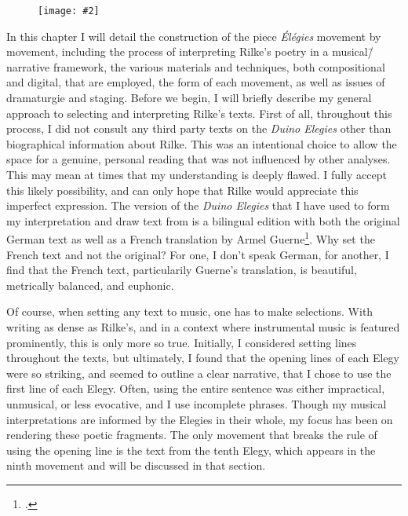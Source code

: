 \documentclass[12pt,twoside,maitrise]{dms_ks}
\newcommand{\customincludegraphics}[4][]{%
    \begin{figure}[H]
        \centering
        \texttt{[image: \#2]}
        \caption{#4}
	\label{#3} 
    \end{figure}
}
\theoremstyle{definition}
\begin{document}
{\customincludegraphics[scale=0.5]{2024-04-28_MH_sat50.png}{fig:live}{}

In this chapter I will detail the construction of the piece \textit{Élégies} movement by movement, including the process of interpreting Rilke's poetry in a musical\=/narrative framework, the various materials and techniques, both compositional and digital, that are employed, the form of each movement, as well as issues of dramaturgie and staging. Before we begin, I will briefly describe my general approach to selecting and interpreting Rilke's texts. First of all, throughout this process, I did not consult any third party texts on the \textit{Duino Elegies} other than biographical information about Rilke. This was an intentional choice to allow the space for a genuine, personal reading that was not influenced by other analyses. This may mean at times that my understanding is deeply flawed. I fully accept this likely possibility, and can only hope that Rilke would appreciate this imperfect expression. The version of the \textit{Duino Elegies} that I have used to form my interpretation and draw text from is a bilingual edition with both the original German text as well as a French translation by Armel Guerne\footcite{rilke_egies_1986}. Why set the French text and not the original? For one, I don't speak German, for another, I find that the French text, particularily Guerne's translation, is beautiful, metrically balanced, and euphonic.   

Of course, when setting any text to music, one has to make selections. 
With writing as dense as Rilke's, and in a context where instrumental music is featured prominently, this is only more so true. 
Initially, I considered setting lines throughout the texts, but ultimately, I found that the opening lines of each Elegy were so striking, and seemed to outline a clear narrative, that I chose to use the first line of each Elegy. 
Often, using the entire sentence was either impractical, unmusical, or less evocative, and I use incomplete phrases. 
Though my musical interpretations are informed by the Elegies in their whole, my focus has been on rendering these poetic fragments. 
The only movement that breaks the rule of using the opening line is the text from the tenth Elegy, which appears in the ninth movement and will be discussed in that section. 

}
\end{document}
